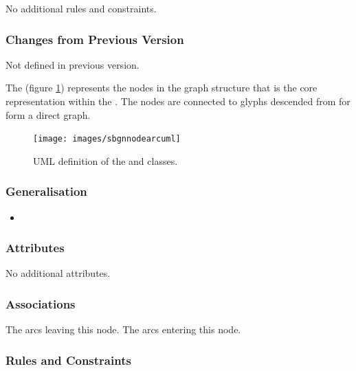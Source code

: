 No additional rules and constraints.

\subsubsection{Changes from Previous Version}

Not defined in previous version.


\label{defn:SBGNNode}

The  (figure \ref{fig:techref:sbgnnodearcuml}) represents
the nodes in the graph structure that is the core representation
within the \PDl. The nodes are connected to glyphs descended from
 for form a direct graph.

\begin{figure}[htb]
  \centering
  \texttt{[image: images/sbgnnodearcuml]}
\caption{UML definition of the  and
   classes.}
  \label{fig:techref:sbgnnodearcuml}
\end{figure}

\subsubsection{Generalisation}

\begin{itemize}
\item {}
\end{itemize}

\subsubsection{Attributes}

No additional attributes.

\subsubsection{Associations}

\begin{attributes}
   The arcs leaving this node.
   The arcs entering this node.
\end{attributes}

\subsubsection{Rules and Constraints}

